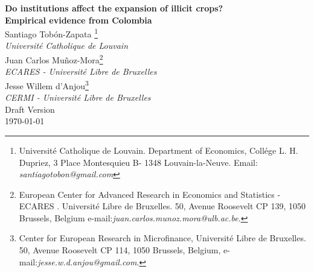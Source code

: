 \documentclass[12pt,a4paper,english]{article}%
\begin{document}
\begin{center}
\textbf{{\Huge Do institutions affect the expansion of illicit crops? } \\ \Large Empirical evidence from Colombia }\\[0.5cm]

{\large Santiago Tob\'on-Zapata \footnote{ Universit\'e Catholique de Louvain. Department of Economics, Coll\'ege L. H. Dupriez, 3 Place Montesquieu B- 1348 Louvain-la-Neuve. Email: \textit{santiagotobon@gmail.com}} \\ \normalsize \textit{Universit\'e Catholique de Louvain}}\\[0.5cm]

{\large Juan Carlos Mu\~noz-Mora\footnote{European Center for Advanced Research in Economics and Statistics -ECARES . Universit\'e Libre de Bruxelles. 50, Avenue Roosevelt CP 139, 1050 Brussels, Belgium  e-mail:\textit{juan.carlos.munoz.mora@ulb.ac.be}.}  \\ \normalsize \textit{ECARES - Universit\'e Libre de Bruxelles}}\\[0.5cm]

{\large Jesse Willem d'Anjou\footnote{Center for European Research in Microfinance, Universit\'e Libre de Bruxelles. 50, Avenue Roosevelt CP 114, 1050 Brussels, Belgium, e-mail:\textit{jesse.w.d.anjou@gmail.com}.}  \\ \normalsize \textit{CERMI - Universit\'e Libre de Bruxelles}}\\[1.5cm]
{\large Draft Version }\\
\large \today 
\end{center}
\end{document}
